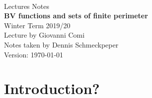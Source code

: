 \documentclass[ngerman]{report}
\begin{document}
\begin{titlepage}
  \centering\text{}\\[14ex]
  \Huge Lectures Notes\\[2ex]
  \Huge {\bf BV functions and sets of finite perimeter}\\[18ex]
  \LARGE Winter Term 2019/20\\[22ex]
  Lecture by Giovanni Comi\\[2ex]
  Notes taken by Dennis Schmeckpeper\\[8ex]
  \Large Version: \today\\
\end{titlepage}
\tableofcontents
\chapter{Introduction?}

\end{document}
